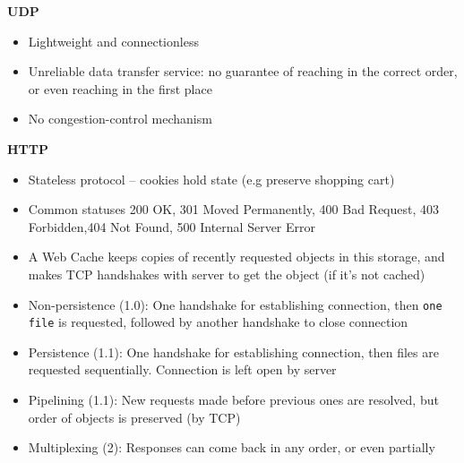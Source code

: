 \documentclass[a4paper]{article} \usepackage[backend=biber, style=numeric, sorting=none]{biblatex}
\begin{document}
\begin{multicols*}{4}
\textbf{UDP}
\begin{itemize}[leftmargin=*]
\item Lightweight and connectionless
\item Unreliable data transfer service: no guarantee of reaching in the correct order, or even reaching in the first place
\item No congestion-control mechanism
\end{itemize}

\textbf{HTTP}
\begin{itemize}[leftmargin=*]
\item Stateless protocol -- cookies hold state (e.g preserve shopping cart)
\item Common statuses 200 OK, 301 Moved Permanently, 400 Bad Request, 403 Forbidden,404 Not Found, 500 Internal Server Error
\item A Web Cache keeps copies of recently requested objects in this storage, and makes TCP handshakes with server to get the object (if it's not cached)
\item Non-persistence (1.0): One handshake for establishing connection, then \texttt{one file} is requested, followed by another handshake to close connection
\item Persistence (1.1): One handshake for establishing connection, then files are requested sequentially. Connection is left open by server
\item Pipelining (1.1): New requests made before previous ones are resolved, but order of objects is preserved (by TCP)
\item Multiplexing (2): Responses can come back in any order, or even partially
\end{itemize}


\end{multicols*}
\end{document}
